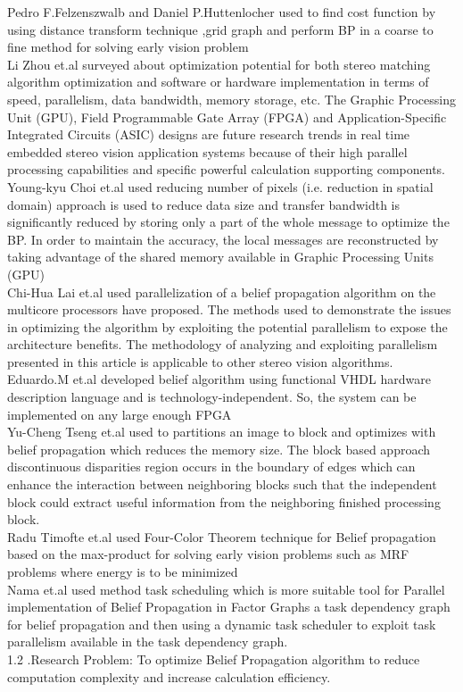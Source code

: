 Pedro F.Felzenszwalb and Daniel P.Huttenlocher \cite{Felzen} used to find cost function by using distance transform technique ,grid graph and perform BP in a coarse to fine method  for solving early vision problem \\
Li Zhou et.al\cite{Li Zhoue} surveyed about  optimization potential for both stereo matching algorithm optimization and software or hardware implementation in terms of speed, parallelism, data bandwidth, memory storage, etc.
The Graphic Processing Unit (GPU), Field Programmable Gate Array (FPGA) and Application-Specific Integrated Circuits (ASIC) designs are future research trends in real time embedded stereo vision application systems because of their high parallel processing capabilities and specific powerful calculation supporting components.\\
Young-kyu Choi et.al\cite{Young} used reducing number of pixels (i.e. reduction in spatial domain) approach is used to reduce data size and transfer bandwidth is significantly reduced by storing only a part of the whole message to optimize the BP.
In order to maintain the accuracy, the local messages are reconstructed by taking advantage of the shared memory available in Graphic Processing Units (GPU)\\
Chi-Hua Lai et.al\cite{Chi-Hua Lai} used  parallelization of a belief propagation algorithm on the multicore processors have proposed. The methods used to demonstrate the issues in optimizing the algorithm by exploiting the potential parallelism to expose the architecture benefits. The methodology of analyzing and exploiting parallelism presented in this article is applicable to other stereo vision algorithms.\\
Eduardo.M et.al\cite{Ed} developed belief algorithm using functional VHDL hardware description language and is technology-independent. So, the system can be implemented on any large enough FPGA \\
Yu-Cheng Tseng et.al\cite{Y.C.} used to partitions an image to block and optimizes with belief propagation which reduces the memory size. The block based approach discontinuous disparities region occurs in the boundary of edges which can enhance the interaction between neighboring blocks such that the independent block could extract useful information from the neighboring finished processing block.\\
Radu Timofte et.al\cite{Radu} used Four-Color Theorem  technique for Belief propagation based on the max-product for solving early vision problems such as MRF problems where energy is to be minimized\\
Nama et.al \cite{Nam Ma} used method task scheduling which is more suitable tool for Parallel implementation of Belief Propagation in Factor Graphs a task dependency graph for belief propagation and then using a dynamic task scheduler to exploit task parallelism available in the task dependency graph.\\
1.2 .Research Problem:  To optimize Belief Propagation algorithm  to reduce computation complexity and increase calculation efficiency.

